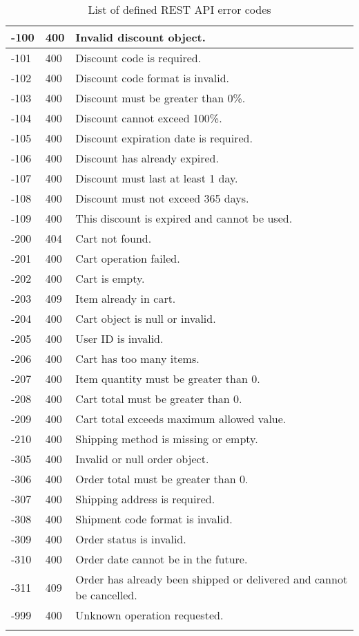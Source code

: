 \begin{longtable}{|p{}|p{} |p{}|}
-100 & 400 & Invalid discount object. \\
\hline
-101 & 400 & Discount code is required. \\
\hline
-102 & 400 & Discount code format is invalid. \\
\hline
-103 & 400 & Discount must be greater than 0\%. \\
\hline
-104 & 400 & Discount cannot exceed 100\%. \\
\hline
-105 & 400 & Discount expiration date is required. \\
\hline
-106 & 400 & Discount has already expired. \\
\hline
-107 & 400 & Discount must last at least 1 day. \\
\hline
-108 & 400 & Discount must not exceed 365 days. \\
\hline
-109 & 400 & This discount is expired and cannot be used. \\
\hline

-200 & 404 & Cart not found. \\
\hline
-201 & 400 & Cart operation failed. \\
\hline
-202 & 400 & Cart is empty. \\
\hline
-203 & 409 & Item already in cart. \\
\hline
-204 & 400 & Cart object is null or invalid. \\
\hline
-205 & 400 & User ID is invalid. \\
\hline
-206 & 400 & Cart has too many items. \\
\hline
-207 & 400 & Item quantity must be greater than 0. \\
\hline
-208 & 400 & Cart total must be greater than 0. \\
\hline
-209 & 400 & Cart total exceeds maximum allowed value. \\
\hline
-210 & 400 & Shipping method is missing or empty. \\
\hline

-305 & 400 & Invalid or null order object. \\
\hline
-306 & 400 & Order total must be greater than 0. \\
\hline
-307 & 400 & Shipping address is required. \\
\hline
-308 & 400 & Shipment code format is invalid. \\
\hline
-309 & 400 & Order status is invalid. \\
\hline
-310 & 400 & Order date cannot be in the future. \\
\hline
-311 & 409 & Order has already been shipped or delivered and cannot be cancelled. \\
\hline

-999 & 400 & Unknown operation requested. \\

\hline
\caption{List of defined REST API error codes}
\label{tab:restErrors}
\end{longtable}
